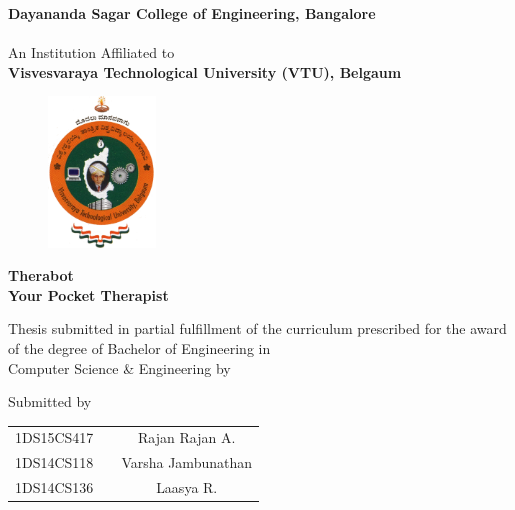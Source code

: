 \begin{titlingpage}

\thispagestyle{empty}
\centering

\setlength{\toptafiddle}{1in}
\setlength{\bottafiddle}{1in}

\vspace*{-0.75in}
\enlargethispage{\toptafiddle}

\textbf{Dayananda Sagar College of Engineering, Bangalore}\\
\hspace{0.1cm}\\
An Institution Affiliated to\\
\textbf{Visvesvaraya Technological University (VTU), Belgaum}\\

\vspace{0.4cm}

\vfill

\begin{figure}[h]
    \centering
    \includegraphics[height=4cm]{images/vtu.png}
\end{figure}

\vfill

\Huge{\textbf{\textcolor{therablue}{Therabot}}}\\
\Large{\textbf{Your Pocket Therapist}}

\vfill

\large Thesis submitted in partial fulfillment of the curriculum
prescribed for the award of the degree of Bachelor of Engineering
in \\Computer Science \& Engineering by\vfill

Submitted by\\
\begin{tabular}{ccc}
1DS15CS417 &  & Rajan Rajan A.\\
1DS14CS118 &  & Varsha Jambunathan\\
1DS14CS136 &  & Laasya R.\\
\end{tabular}

\vfill


\end{titlingpage}
